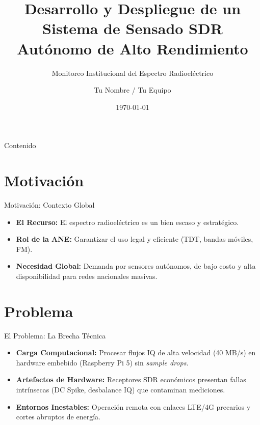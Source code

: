 \documentclass[aspectratio=169]{beamer}
\title[Sensado SDR Autónomo - ANE]{Desarrollo y Despliegue de un Sistema de Sensado SDR Autónomo de Alto Rendimiento}
\subtitle{Monitoreo Institucional del Espectro Radioeléctrico}
\author[Tu Nombre]{Tu Nombre / Tu Equipo}
\institute[Tu Institución]{Nombre de tu Grupo de Investigación o Universidad \\ \vspace{0.2cm} Proyecto en contexto con la ANE}
\date{\today}
\begin{document}
\begin{frame}
    \titlepage
\end{frame}

\begin{frame}{Contenido}
    \tableofcontents
\end{frame}

\section{Motivación}
\begin{frame}{Motivación: Contexto Global}
    \begin{itemize}
        \item \textbf{El Recurso:} El espectro radioeléctrico es un bien escaso y estratégico.
        \item \textbf{Rol de la ANE:} Garantizar el uso legal y eficiente (TDT, bandas móviles, FM).
        \item \textbf{Necesidad Global:} Demanda por sensores autónomos, de bajo costo y alta disponibilidad para redes nacionales masivas.
    \end{itemize}
\end{frame}

\section{Problema}
\begin{frame}{El Problema: La Brecha Técnica}
    \begin{itemize}
        \item \textbf{Carga Computacional:} Procesar flujos IQ de alta velocidad (40 MB/s) en hardware embebido (Raspberry Pi 5) sin \textit{sample drops}.
        \item \textbf{Artefactos de Hardware:} Receptores SDR económicos presentan fallas intrínsecas (DC Spike, desbalance IQ) que contaminan mediciones.
        \item \textbf{Entornos Inestables:} Operación remota con enlaces LTE/4G precarios y cortes abruptos de energía.
    \end{itemize}
\end{frame}

\end{document}
